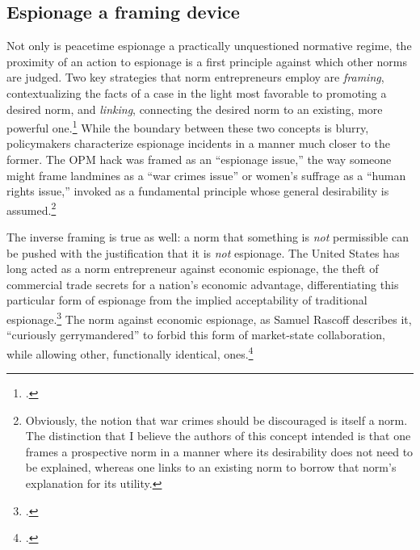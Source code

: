 \documentclass[12pt]{extarticle}
\begin{document}
\subsection{Espionage a framing device}
Not only is peacetime espionage a practically unquestioned normative regime, the proximity of an action to espionage is a first principle against which other norms are judged. Two key strategies that norm entrepreneurs employ are \emph{framing}, contextualizing the facts of a case in the light most favorable to promoting a desired norm, and \emph{linking}, connecting the desired norm to an existing, more powerful one.\footcite[451]{finnemore_constructing_2016} While the boundary between these two concepts is blurry, policymakers characterize espionage incidents in a manner much closer to the former. The OPM hack was framed as an \enquote{espionage issue,} the way someone might frame landmines as a \enquote{war crimes issue} or women's suffrage as a \enquote{human rights issue,} invoked as a fundamental principle whose general desirability is assumed.\footnote{Obviously, the notion that war crimes should be discouraged is itself a norm. The distinction that I believe the authors of this concept intended is that one frames a prospective norm in a manner where its desirability does not need to be explained, whereas one links to an existing norm to borrow that norm's explanation for its utility.}

The inverse framing is true as well: a norm that something is \emph{not} permissible can be pushed with the justification that it is \emph{not} espionage. The United States has long acted as a norm entrepreneur against economic espionage, the theft of commercial trade secrets for a nation's economic advantage, differentiating this particular form of espionage from the implied acceptability of traditional espionage.\footcite[19]{nye_normative_2018} The norm against economic espionage, as Samuel Rascoff describes it, \enquote{curiously gerrymandered} to forbid this form of market-state collaboration, while allowing other, functionally identical, ones.\footcite[250]{rascoff_norm_2016}




\end{document}
